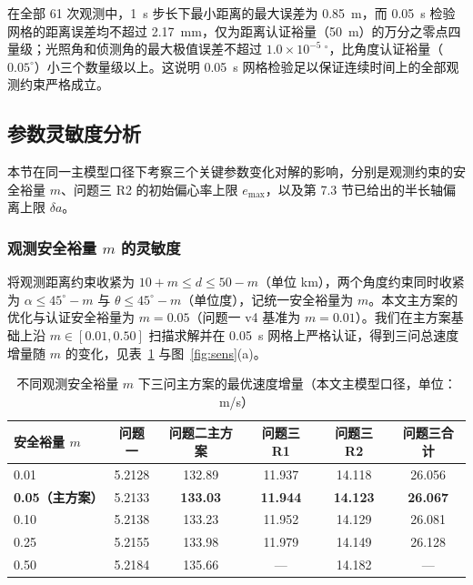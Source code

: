 在全部 61 次观测中，1~s 步长下最小距离的最大误差为 0.85~m，而 0.05~s 检验网格的距离误差均不超过 2.17~mm，仅为距离认证裕量（50~m）的万分之零点四量级；光照角和侦测角的最大极值误差不超过 $1.0\times 10^{-5}\ {}^\circ$，比角度认证裕量（$0.05^\circ$）小三个数量级以上。这说明 0.05~s 网格检验足以保证连续时间上的全部观测约束严格成立。

\subsection{参数灵敏度分析}

本节在同一主模型口径下考察三个关键参数变化对解的影响，分别是观测约束的安全裕量 $m$、问题三 R2 的初始偏心率上限 $e_{\max}$，以及第 7.3 节已给出的半长轴偏离上限 $\delta a$。

\subsubsection{观测安全裕量 $m$ 的灵敏度}

将观测距离约束收紧为 $10 + m \le d \le 50 - m$（单位 km），两个角度约束同时收紧为 $\alpha \le 45^\circ - m$ 与 $\theta \le 45^\circ - m$（单位度），记统一安全裕量为 $m$。本文主方案的优化与认证安全裕量为 $m = 0.05$（问题一 v4 基准为 $m = 0.01$）。我们在主方案基础上沿 $m \in [0.01, 0.50]$ 扫描求解并在 0.05~s 网格上严格认证，得到三问总速度增量随 $m$ 的变化，见表~\ref{tab:sensm} 与图~\ref{fig:sens}(a)。

\begin{table}[!htb]
  \centering
  \caption{不同观测安全裕量 $m$ 下三问主方案的最优速度增量（本文主模型口径，单位：m/s）}
  \label{tab:sensm}
  \begin{tabular}{lccccc}
    \toprule
    安全裕量 $m$ & 问题一 & 问题二主方案 & 问题三 R1 & 问题三 R2 & 问题三合计 \\
    \midrule
    0.01 & 5.2128 & 132.89 & 11.937 & 14.118 & 26.056 \\
    \textbf{0.05（主方案）} & 5.2133 & \textbf{133.03} & \textbf{11.944} & \textbf{14.123} & \textbf{26.067} \\
    0.10 & 5.2138 & 133.23 & 11.952 & 14.129 & 26.081 \\
    0.25 & 5.2155 & 133.98 & 11.979 & 14.149 & 26.128 \\
    0.50 & 5.2184 & 135.66 & — & 14.182 & — \\
    \bottomrule
  \end{tabular}
\end{table}

